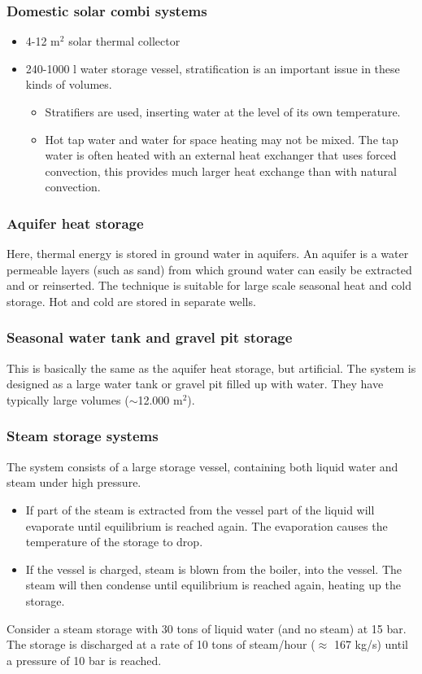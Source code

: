 \documentclass[a4paper,10pt]{article}
\begin{document}
\subsubsection{Domestic solar combi systems}

\begin{itemize}
 \item 4-12 m$^2$ solar thermal collector
 \item 240-1000 l water storage vessel, stratification is an important issue in these kinds of volumes. 
 \begin{itemize}
 \item Stratifiers are used, inserting water at the level of its own temperature.
 \item Hot tap water and water for space heating may not be mixed. The tap water is often heated with an external heat exchanger that uses forced convection, this provides much larger heat exchange than with natural convection.
 \end{itemize}
\end{itemize}

\subsubsection{Aquifer heat storage}
Here, thermal energy is stored in ground water in aquifers. An aquifer is a water permeable layers (such as sand) from which ground water can easily be extracted and or reinserted. The technique is suitable for large scale seasonal heat and cold storage. Hot and cold are stored in separate wells. 

\subsubsection{Seasonal water tank and gravel pit storage}
This is basically the same as the aquifer heat storage, but artificial.  The system is designed as a large water tank or gravel pit filled up with water. They have typically large volumes ($\sim$12.000 m$^2$).

\subsubsection{Steam storage systems}
The system consists of a large storage vessel, containing both liquid water and steam under high pressure. 
\begin{itemize}
 \item If part of the steam is extracted from the vessel part of the liquid will evaporate until equilibrium is reached again. The evaporation causes the temperature of the storage to drop.
 \item If the vessel is charged, steam is blown from the boiler, into the vessel. The steam will then condense until equilibrium is reached again, heating up the storage.
\end{itemize}
Consider a steam storage with 30 tons of liquid water (and no steam) at 15 bar. The storage is discharged at a rate of 10 tons of steam/hour ($\approx$ 167 kg/s) until a pressure of 10 bar is reached. \bigskip
\end{document}
